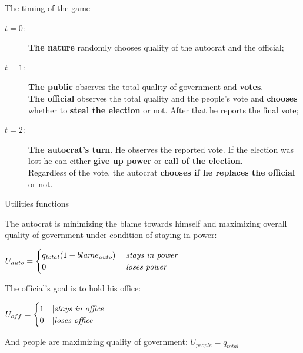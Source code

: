 \documentclass{beamer}
\begin{document}
\begin{frame}{\hypertarget{time}{The timing of the game}}
    \begin{description}
	    \item[\hyperlink{time1}{$t = 0$}:] {\textbf{The nature} randomly chooses quality of the autocrat and the official;}
	    
	    \item[\hyperlink{time2}{$t = 1$}:] { \textbf{The public} observes the total quality of government and \textbf{votes}.\\
	    \textbf{The official} observes the total quality and the people's vote and \textbf{chooses} whether to \textbf{steal the election} or not. After that he reports the final vote;}
	    
	    \item[\hyperlink{time3}{$t = 2$}:] {\textbf{The autocrat's turn}. He observes the reported vote. If the election was lost he can either \textbf{give up power}  or \textbf{call of the election}.\\
	    Regardless of the vote, the autocrat \textbf{chooses if he replaces the official} or not.}
    
	\end{description}
\end{frame}

\begin{frame}{Utilities functions}
    
    \noindent The autocrat is minimizing the blame towards himself and maximizing overall quality of government under condition of staying in power:
	\begin{center}
	    $U_{auto} = \begin{cases}
        q_{total} (1 - blame_{auto}) &  \textbar  \textit{stays in power}\\
        0  & \textbar  \textit{loses power}
	    \end{cases}$
	\end{center}
	
	\noindent The official's goal is to hold his office:
	\begin{center}
	    $U_{off} = \begin{cases}
        1 &  \textbar  \textit{stays in office}\\
        0 &  \textbar  \textit{loses office}
	    \end{cases}$
	\end{center}
	And people are maximizing quality of government: $U_{people} = q_{total}$
    
\end{frame}
\end{document}

